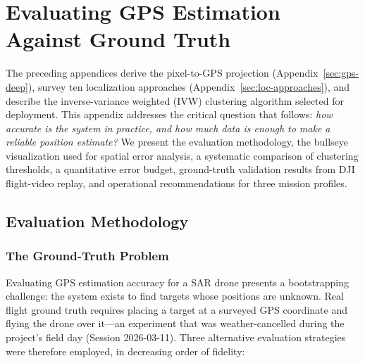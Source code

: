 
\section{Evaluating GPS Estimation Against Ground Truth}\label{sec:estimation-eval}

The preceding appendices derive the pixel-to-GPS projection (Appendix~\ref{sec:gps-deep}), survey ten localization approaches (Appendix~\ref{sec:loc-approaches}), and describe the inverse-variance weighted (IVW) clustering algorithm selected for deployment.  This appendix addresses the critical question that follows: \emph{how accurate is the system in practice, and how much data is enough to make a reliable position estimate?}  We present the evaluation methodology, the bullseye visualization used for spatial error analysis, a systematic comparison of clustering thresholds, a quantitative error budget, ground-truth validation results from DJI flight-video replay, and operational recommendations for three mission profiles.

\subsection{Evaluation Methodology}\label{sec:eval-methodology}

\subsubsection{The Ground-Truth Problem}

Evaluating GPS estimation accuracy for a SAR drone presents a bootstrapping challenge: the system exists to find targets whose positions are unknown.  Real flight ground truth requires placing a target at a surveyed GPS coordinate and flying the drone over it---an experiment that was weather-cancelled during the project's field day (Session 2026-03-11).  Three alternative evaluation strategies were therefore employed, in decreasing order of fidelity:

